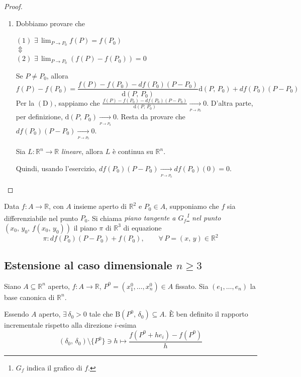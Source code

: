 \begin{proof}
\begin{enumerate}[labelindent=\parindent,leftmargin=*,label=\textnormal{(\roman*)},start=1]
\item
Dobbiamo provare che
	\begin{center}
	$\mathrm{(1)}$
	\hfill
	$\displaystyle \exists \, \lim_{P \rightarrow P_0} f(P) = f(P_0)$\hfill\null\\
	\hfill
	$\Updownarrow$
	\hfill\null\\
	$\mathrm{(2)}$
	\hfill
	$\displaystyle \exists \, \lim_{P \rightarrow P_0} (f(P)-f(P_0)) = 0$\hfill\null
	\end{center}
	Se $P \neq P_0$, allora
	$$
	f(P) - f(P_0) =
	\frac{f(P)-f(P_0)-df(P_0)(P-P_0)}{\mathrm{d}(P,\,P_0)}\mathrm{d}(P,\,P_0)+df(P_0)(P-P_0)
	$$
	Per la $\mathrm{(D)}$, sappiamo che $\frac{f(P)-f(P_0)-df(P_0)(P-P_0)}{\mathrm{d}(P,\,P_0)} \underset{_{P \rightarrow P_0}}{\longrightarrow} 0$. D'altra parte, per definizione, $\mathrm{d}(P,\,P_0) \underset{_{P \rightarrow P_0}}{\longrightarrow} 0$. Resta da provare che $df(P_0)(P-P_0) \underset{_{P \rightarrow P_0}}{\longrightarrow} 0$.
	\begin{exer}
	Sia $L:\mathbb{R}^n \longrightarrow \mathbb{R}$ \emph{lineare}, allora $L$ è continua su $\mathbb{R}^n$.
	\end{exer}
	Quindi, usando l'esercizio, $df(P_0)(P-P_0) \underset{_{P \rightarrow P_0}}{\longrightarrow}  df(P_0)(0) = 0$.
\end{enumerate}
\end{proof}

\begin{definition}
Data $f:A \longrightarrow \mathbb{R}$, con $A$ insieme aperto di $\mathbb{R}^2$ e $P_0 \in A$, supponiamo che $f$ sia differenziabile nel punto $P_0$. Si chiama \emph{piano tangente a $G_f$\footnote{$G_f$ indica il grafico di $f$.} nel punto $(x_0,\,y_0,\,f(x_0,\,y_0))$} il piano $\pi$ di $\mathbb{R}^3$ di equazione
$$\pi : df(P_0)(P-P_0) + f(P_0), \qquad \forall \, P=(x,\,y) \in \mathbb{R}^2$$
\end{definition}

\subsection{Estensione al caso dimensionale $n \geq 3$}
Siano $A \subseteq \mathbb{R}^n$ aperto, $f: A \longrightarrow \mathbb{R}$, $P^0 = (x_1^0,\ldots,x_n^0) \in A$ fissato. Sia $(e_1,\ldots,e_n)$ la base canonica di $\mathbb{R}^n$.

Essendo $A$ aperto, $\exists \, \delta_0 > 0$ tale che $\mathrm{B}(P^0,\,\delta_0) \subseteq A$. \`E ben definito il rapporto incrementale rispetto alla direzione $i$-esima
$$
(\delta_0,\,\delta_0) \setminus \lbrace P^0 \rbrace \ni h \longmapsto
\frac{f(P^0+he_i)-f(P^0)}{h}
$$

